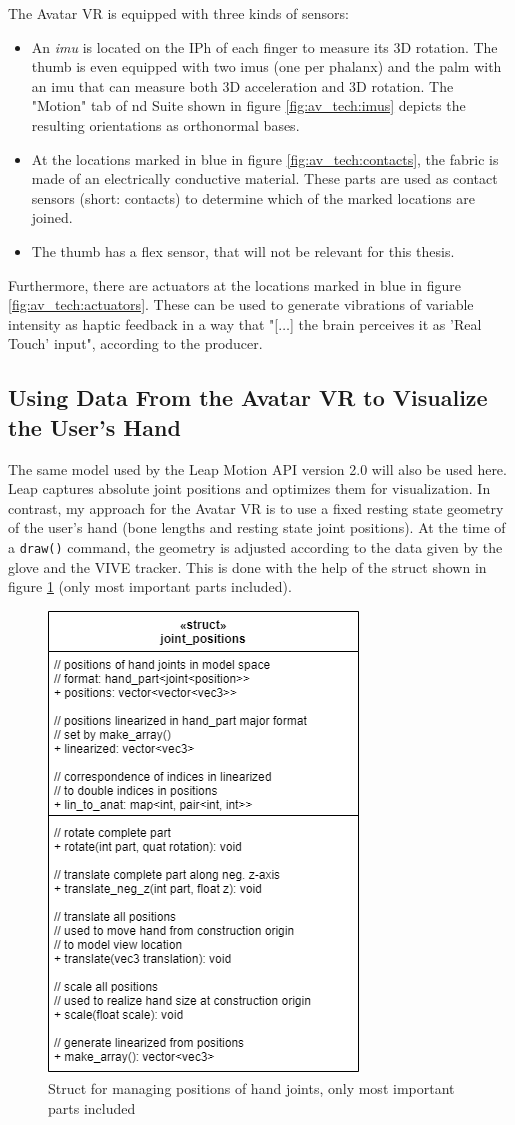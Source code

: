 \documentclass[hyperref, bachelorofscience]{cgvpub}
\begin{document}
The Avatar VR is equipped with three kinds of sensors: 
\vspace{.3cm}
\begin{itemize}
	\item An \emph{\acrfull{imu}} is located on the \gls{IPh} of each finger to measure its 3D rotation. The thumb is even equipped with two \acrshort{imu}s (one per phalanx) and the palm with an \acrshort{imu} that can measure both 3D acceleration and 3D rotation. The "Motion" tab of \acrshort{nd} Suite shown in figure \ref{fig:av_tech:imus} depicts the resulting orientations as orthonormal bases. 
	\item At the locations marked in blue in figure \ref{fig:av_tech:contacts}, the fabric is made of an electrically conductive material. These parts are used as contact sensors (short: contacts) to determine which of the marked locations are joined.
	\item The thumb has a flex sensor, that will not be relevant for this thesis.
\end{itemize}

Furthermore, there are actuators at the locations marked in blue in figure \ref{fig:av_tech:actuators}. These can be used to generate vibrations of variable intensity as haptic feedback in a way that "[$\dots$] the brain perceives it as 'Real Touch' input", according to the producer.

\subsection{Using Data From the Avatar VR to Visualize the User's Hand} \label{subsec:avr_to_hand}
The same model used by the Leap Motion API version 2.0 will also be used here. Leap captures absolute joint positions and optimizes them for visualization. In contrast, my approach for the Avatar VR is to use a fixed resting state geometry of the user's hand (bone lengths and resting state joint positions). At the time of a \lstinline|draw()| command, the geometry is adjusted according to the data given by the glove and the \Gls{VIVE} tracker. This is done with the help of the struct shown in figure \ref{fig:joint_positions} (only most important parts included).

\begin{figure}
	\includegraphics[width=.4\linewidth]{../pics/joint_positions}
	\caption{Struct for managing positions of hand joints, only most important parts included}
	\label{fig:joint_positions}
\end{figure}
\end{document}

